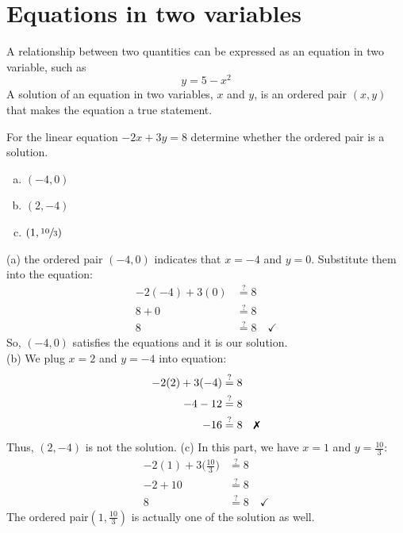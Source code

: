 \section{Equations in two variables}
A relationship between two quantities can be expressed as an equation in two variable, such as\[
        y = 5-x^2
\]
A solution of an equation in two variables, $x$ and $y$, is an ordered pair $(x,y)$ that makes the equation a true statement. 
\begin{exa}
	For the linear equation $-2x+3y=8$ determine whether the ordered pair is a 
    solution.
    \begin{enumerate}[(a)]
    \item $(-4,0)$
    \item $(2,-4)$
    \item $(1, \sfrac{10}{3})$
    \end{enumerate}
\end{exa}


(a) the ordered pair $(-4,0)$ indicates that $x=-4$ and $y=0$. Substitute them into the equation:
\begin{align*}
		-2(-4)+3(0) &\stackrel{?}{=}8 \\
        8+0 & \stackrel{?}{=} 8\\
        8 &\stackrel{?}{=} 8\quad \checkmark
\end{align*}
So, $(-4,0)$ satisfies the equations and it is our solution.\\
(b) We plug $x=2$ and $y=-4$ into equation:
\begin{align*}
		-2(2)+3(-4) &\stackrel{?}{=} 8 \\
        -4-12 &\stackrel{?}{=} 8\\
        -16 &\stackrel{?}{=} 8\quad  \text{\xmark}
\end{align*}
Thus, $(2,-4)$ is not the solution.
(c) In this part, we have $x=1$ and $y=\frac{10}{3}$:
\begin{align*}
		-2(1)+3\biggl(\frac{10}{3}\biggr) &\stackrel{?}{=} 8 \\
        -2+10 &\stackrel{?}{=} 8\\
        8 &\stackrel{?}{=} 8\quad  \checkmark
\end{align*}
The ordered pair$\left(1,\frac{10}{3}\right)$ is actually one of the solution as well.
